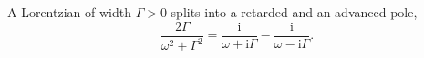 \documentclass{article}
\newcommand{\ii}{\mathrm{i}}
\newcommand{\Lor}[1]{\frac{2\Gamma}{#1^2+\Gamma^2}}
\begin{document}
A Lorentzian of width $\Gamma>0$ splits into a retarded and an advanced pole,
\begin{equation}
  \Lor{\omega} = \frac{\ii}{\omega + \ii\Gamma} - \frac{\ii}{\omega - \ii\Gamma} .
  \label{eq:lorentzian-split}
\end{equation}
\end{document}
